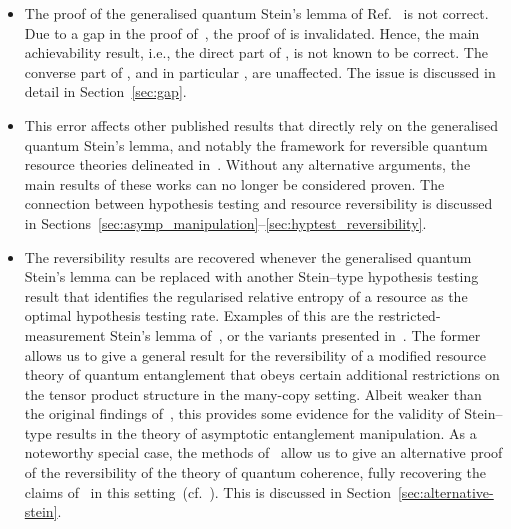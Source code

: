 \documentclass[11pt,notitlepage,tightenlines,nofootinbib,superscriptaddress]{revtex4-1}
\begin{document}
\begin{itemize}
    \item The proof of the generalised quantum Stein's lemma of Ref.~\cite{Brandao2010} is not correct. Due to a gap in the proof of~\cite[Lemma~III.9]{Brandao2010}, the proof of \cite[Lemma~III.7]{Brandao2010} is invalidated. Hence, the main achievability result, i.e., the direct part of \cite[Proposition~III.1]{Brandao2010}, is not known to be correct. The converse part of \cite[Proposition~III.1]{Brandao2010}, and in particular \cite[Corollary~III.3]{Brandao2010}, are unaffected. The issue is discussed in detail in Section~\ref{sec:gap}.
    
    \item This error affects other published results that directly rely on the generalised quantum Stein's lemma, and notably the framework for reversible quantum resource theories delineated in~\cite{BrandaoPlenio1,BrandaoPlenio2,Brandao-Gour}. Without any alternative %
  arguments, the main results of these works can no longer be considered proven. %
  The connection between hypothesis testing and resource reversibility is discussed in Sections~\ref{sec:asymp_manipulation}--\ref{sec:hyptest_reversibility}.
  
    \item The reversibility results are recovered whenever the generalised quantum Stein's lemma can be replaced with another Stein--type hypothesis testing result that identifies the regularised relative entropy of a resource as the optimal hypothesis testing rate. Examples of this are the restricted-measurement Stein's lemma of~\cite{brandao_adversarial}, or the variants presented in~\cite{berta_composite}. %
    The former allows us to give a general result for the reversibility of a modified resource theory of quantum entanglement that obeys certain additional restrictions on the tensor product structure in the many-copy setting. Albeit weaker than the original findings of~\cite{BrandaoPlenio1,BrandaoPlenio2,Brandao-Gour}, this provides some evidence for the validity of Stein--type results in the theory of asymptotic entanglement manipulation.
    As a noteworthy special case, the methods of~\cite{berta_composite} allow us to give an alternative proof of the reversibility of the theory of quantum coherence, fully recovering the claims of~\cite{Brandao-Gour} in this setting~(cf.~\cite{Chitambar-reversible}). This is discussed in Section~\ref{sec:alternative-stein}.
    

\end{itemize}
\end{document}
